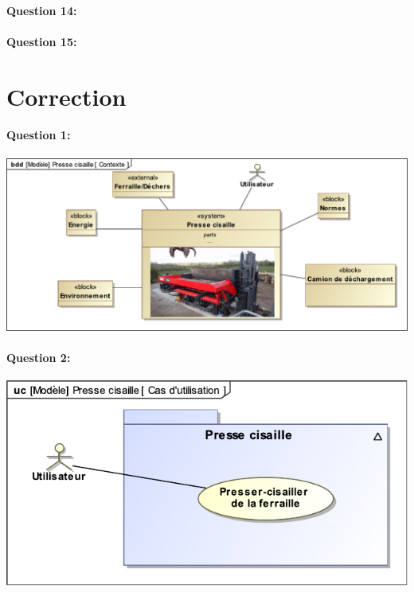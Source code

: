 \paragraph{Question 14:}

\reponse[7]

\paragraph{Question 15:}

\reponse[7]

\ifdef{\public}{}{}

\newpage
\cleardoublepage

\pagestyle{correction}

\section{Correction}

\paragraph{Question 1:}

\begin{center}
 \includegraphics[width=0.8\linewidth]{img/contexte_corrige}
\end{center}

\paragraph{Question 2:}

\begin{center}
 \includegraphics[width=0.8\linewidth]{img/use_case_corrige}
\end{center}

